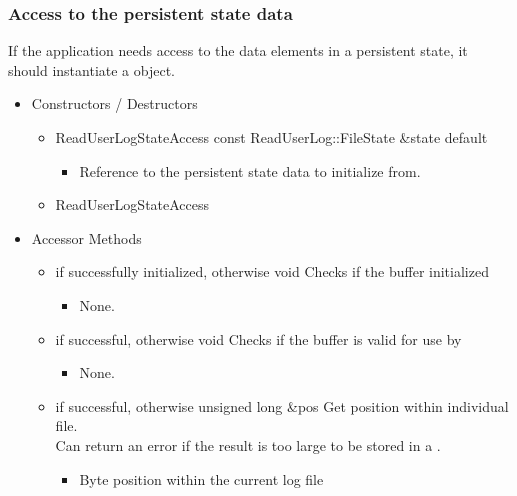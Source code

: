 \subsubsection{Access to the persistent state data}

If the application needs access to the data elements in a persistent
state, it should instantiate a  object.

\begin{itemize}
\item Constructors / Destructors

\begin{itemize}
\item \Constructor
  {ReadUserLogStateAccess}
  {const ReadUserLog::FileState \&state}
  {default}
  \begin{itemize}
  \item {}
    Reference to the persistent state data to initialize from.
  \end{itemize}

\item \Destructor
  {ReadUserLogStateAccess}
\end{itemize}

\item Accessor Methods
\begin{itemize}

\item {}
  {} { if successfully initialized,  otherwise}
  {void}
  {Checks if the buffer initialized}
  \begin{itemize} \item None. \end{itemize}

\item {}
  {} { if successful,  otherwise}
  {void}
  {Checks if the buffer is valid for use by 
  }
  \begin{itemize} \item None. \end{itemize}

\item {}
  {} { if successful,  otherwise}
  {unsigned long \&pos}
  {Get position within individual file.
    \\ \Note Can return an error if the result is too large to be
    stored in a .}
  \begin{itemize}
  \item {}
    Byte position within the current log file
  \end{itemize}


\end{itemize}
\end{itemize}
